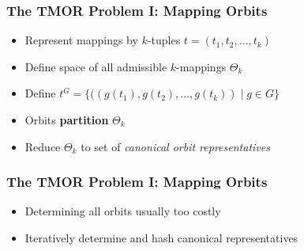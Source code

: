 \documentclass{beamer}
\begin{document}
\begin{frame}
  \frametitle{The TMOR Problem I: Mapping Orbits}

  \begin{itemize}
    \setlength\itemsep{.25cm}

    \item<1-> Represent mappings by $k$-tuples $t = (t_1, t_2, \dots, t_k)$
    \item<2-> Define space of all admissible $k$-mappings $\Theta_k$
    \item<3-> Define $t^G = \{((g(t_1), g(t_2), \dots, g(t_k))
          \mid g \in G\}$
    \item<4-> Orbits \textbf{partition} $\Theta_k$
    \item<5-> Reduce $\Theta_k$ to set of \textit{canonical orbit representatives}
  \end{itemize}
\end{frame}

\begin{frame}
  \frametitle{The TMOR Problem I: Mapping Orbits}

  \begin{itemize}
    \setlength\itemsep{.25cm}

    \item<1-> Determining all orbits usually too costly
    \item<2-> Iteratively determine and hash canonical representatives
  \end{itemize}

  \vspace{.25cm}

\end{frame}
\end{document}
